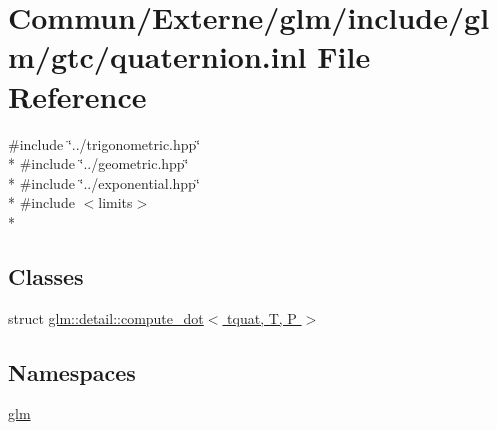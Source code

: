 \hypertarget{glm_2include_2glm_2gtc_2quaternion_8inl}{}\section{Commun/\+Externe/glm/include/glm/gtc/quaternion.inl File Reference}
\label{glm_2include_2glm_2gtc_2quaternion_8inl}
{\ttfamily \#include \char`\"{}../trigonometric.\+hpp\char`\"{}}\\*
{\ttfamily \#include \char`\"{}../geometric.\+hpp\char`\"{}}\\*
{\ttfamily \#include \char`\"{}../exponential.\+hpp\char`\"{}}\\*
{\ttfamily \#include $<$limits$>$}\\*
\subsection*{Classes}
\begin{DoxyCompactItemize}
\item 
struct \hyperlink{structglm_1_1detail_1_1compute__dot_3_01tquat_00_01_t_00_01_p_01_4}{glm\+::detail\+::compute\+\_\+dot$<$ tquat, T, P $>$}
\end{DoxyCompactItemize}
\subsection*{Namespaces}
\begin{DoxyCompactItemize}
\item 
 \hyperlink{namespaceglm}{glm}
\end{DoxyCompactItemize}
